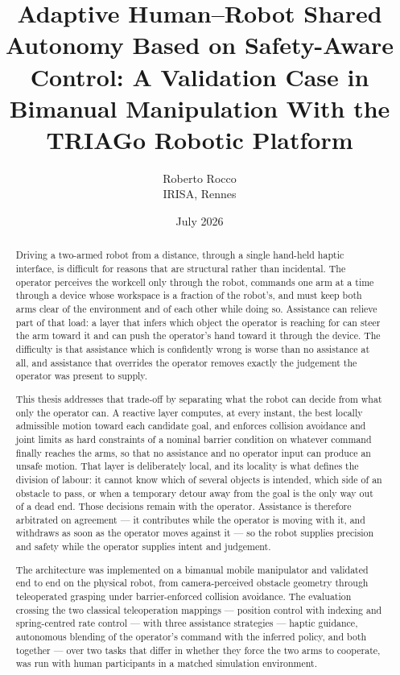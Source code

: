 \documentclass[12pt,a4paper,twoside,openright]{report}
\title{\textbf{Adaptive Human--Robot Shared Autonomy Based on Safety-Aware Control: A Validation Case in Bimanual Manipulation With the TRIAGo Robotic Platform}}
\author{Roberto Rocco \\ IRISA, Rennes}
\date{July 2026}
\begin{document}
\maketitle

\begin{abstract}
\noindent Driving a two-armed robot from a distance, through a single hand-held haptic interface, is difficult for reasons that are structural rather than incidental. The operator perceives the workcell only through the robot, commands one arm at a time through a device whose workspace is a fraction of the robot's, and must keep both arms clear of the environment and of each other while doing so. Assistance can relieve part of that load: a layer that infers which object the operator is reaching for can steer the arm toward it and can push the operator's hand toward it through the device. The difficulty is that assistance which is confidently wrong is worse than no assistance at all, and assistance that overrides the operator removes exactly the judgement the operator was present to supply.

This thesis addresses that trade-off by separating what the robot can decide from what only the operator can. A reactive layer computes, at every instant, the best locally admissible motion toward each candidate goal, and enforces collision avoidance and joint limits as hard constraints of a nominal barrier condition on whatever command finally reaches the arms, so that no assistance and no operator input can produce an unsafe motion. That layer is deliberately local, and its locality is what defines the division of labour: it cannot know which of several objects is intended, which side of an obstacle to pass, or when a temporary detour away from the goal is the only way out of a dead end. Those decisions remain with the operator. Assistance is therefore arbitrated on agreement --- it contributes while the operator is moving with it, and withdraws as soon as the operator moves against it --- so the robot supplies precision and safety while the operator supplies intent and judgement.

The architecture was implemented on a bimanual mobile manipulator and validated end to end on the physical robot, from camera-perceived obstacle geometry through teleoperated grasping under barrier-enforced collision avoidance. The evaluation crossing the two classical teleoperation mappings --- position control with indexing and spring-centred rate control --- with three assistance strategies --- haptic guidance, autonomous blending of the operator's command with the inferred policy, and both together --- over two tasks that differ in whether they force the two arms to cooperate, was run with human participants in a matched simulation environment.


\end{abstract}
\end{document}
